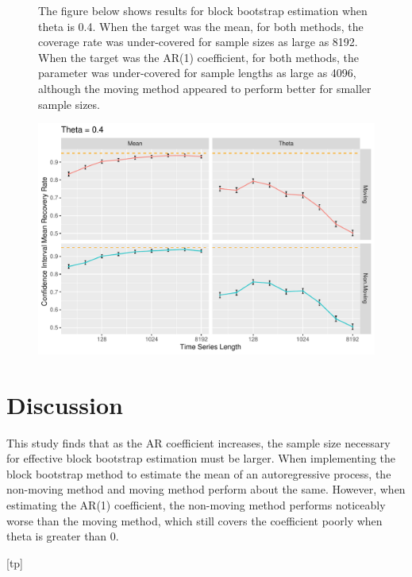 \documentclass[12pt, letterpaper, titlepage]{article}
\begin{document}
\begin{figure}[tbp]
\caption{The figure below shows results for block bootstrap estimation when theta is 0.4. When the target was the mean, for both methods, the coverage rate was under-covered for sample sizes as large as 8192. When the target was the AR(1) coefficient, for both methods, the parameter was under-covered for sample lengths as large as 4096, although the moving method appeared to perform better for smaller sample sizes. }
  \centering
  \includegraphics[width=\textwidth]{theta_0.4}
  \caption{}
  \label{fig:theta_0.4}
\end{figure}

\section{Discussion}
\label{sec:discuss}

This study finds that as the AR coefficient increases, the sample size necessary for effective block bootstrap estimation must be larger. When implementing the block bootstrap method to estimate the mean of an autoregressive process, the non-moving method and moving method perform about the same. However, when estimating the AR(1) coefficient, the non-moving method performs noticeably worse than the moving method, which still covers the coefficient poorly when theta is greater than 0.




[tp]
\end{document}
